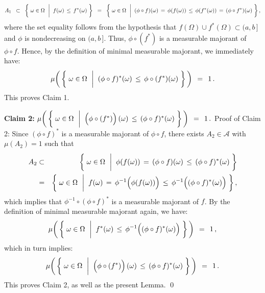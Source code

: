 \begin{equation*}
A_{1}
\;\;\subset\;\;
	\left\{\;
		\omega \in \Omega
		\,\;\left\vert\;\;
		f(\omega) \,\overset{{\color{white}\vert}}{\leq}\, f^{*}(\omega)
	\right.
	\,\right\}
\;\; = \;\;
	\left\{\;
		\omega \in \Omega
		\,\;\left\vert\;\;
		(\phi \circ f)(\omega) \,=\, \phi(f(\omega)) \,\overset{{\color{white}\vert}}{\leq}\, \phi(f^{*}(\omega)) \,=\, (\phi \circ f^{*})(\omega)
	\right.
	\,\right\},
\end{equation*}
where the set equality follows from the hypothesis that $f(\Omega) \cup f^{*}(\Omega) \subset (a,b\,]$
and $\phi$ is nondecreasing on $(a,b\,]$.
Thus, $\phi \circ (f^{*})$ is a measurable majorant of $\phi \circ f$.
Hence, by the definition of minimal measurable majorant, we immediately have:
\begin{equation*}
\mu\!\left(\,\left\{\;
	\omega \in \Omega
	\,\;\left\vert\;\;
	(\phi \circ f)^{*}(\omega) \,\overset{{\color{white}\vert}}{\leq}\, \phi \circ (f^{*})(\omega)
	\right.
\,\right\}\,\right)
\,\;=\;\, 1\,.
\end{equation*}
This proves Claim 1.

\vskip 0.5cm
\noindent
\textbf{Claim 2:}\quad
$\mu\!\left(\,\left\{\;
	\omega \in \Omega
	\,\;\left\vert\;\;
	\left(\overset{{\color{white}.}}{\phi} \circ (f^{*})\right)(\omega)
		\,\overset{{\color{white}\vert}}{\leq}\,
		(\phi \circ f)^{*}(\omega)
	\right.
\,\right\}\,\right)
\,\;=\;\, 1\,.
$
\vskip 0.2cm
\noindent
Proof of Claim 2:\;\;
Since $(\phi \circ f)^{*}$ is a measurable majorant of $\phi \circ f$,
there exists $A_{2} \in \mathcal{A}$ with $\mu(A_{2}) = 1$ such that
\begin{eqnarray*}
A_{2}
&\subset&
	\left\{\;
		\omega \in \Omega
		\,\;\left\vert\;\;
		\phi(f(\omega)) \,=\, (\phi \circ f)(\omega) \,\overset{{\color{white}\vert}}{\leq}\, (\phi \circ f)^{*}(\omega)
	\right.
	\,\right\}
\\
& = &
	\left\{\;
		\omega \in \Omega
		\,\;\left\vert\;\;
		f(\omega)
			\,=\,
				\phi^{-1}\!\left(\overset{{\color{white}.}}{\phi}(f(\omega))\right)
			\,\overset{{\color{white}\vert}}{\leq}\,
				\phi^{-1}\!\left((\overset{{\color{white}.}}{\phi} \circ f)^{*}(\omega)\right)
	\right.
	\,\right\},
\end{eqnarray*}
which implies that $\phi^{-1} \circ (\phi \circ f)^{*}$ is a measurable majorant of $f$.
By the definition of minimal measurable majorant again, we have:
\begin{equation*}
\mu\!\left(\,\left\{\;
	\omega \in \Omega
	\,\;\left\vert\;\;
	f^{*}(\omega) \,\overset{{\color{white}\vert}}{\leq}\, \phi^{-1}\!\left((\overset{{\color{white}.}}{\phi} \circ f)^{*}(\omega)\right)
	\right.
\,\right\}\,\right)
\,\;=\;\, 1\,,
\end{equation*}
which in turn implies:
\begin{equation*}
\mu\!\left(\,\left\{\;
	\omega \in \Omega
	\,\;\left\vert\;\;
	\left(\overset{{\color{white}.}}{\phi} \circ (f^{*})\right)(\omega)
		\,\overset{{\color{white}\vert}}{\leq}\,
		(\phi \circ f)^{*}(\omega)
	\right.
\,\right\}\,\right)
\,\;=\;\, 1\,.
\end{equation*}
This proves Claim 2, as well as the present Lemma.
\qed


\renewcommand{\theenumi}{\roman{enumi}}
\renewcommand{\labelenumi}{\textnormal{(\theenumi)}$\;\;$}

